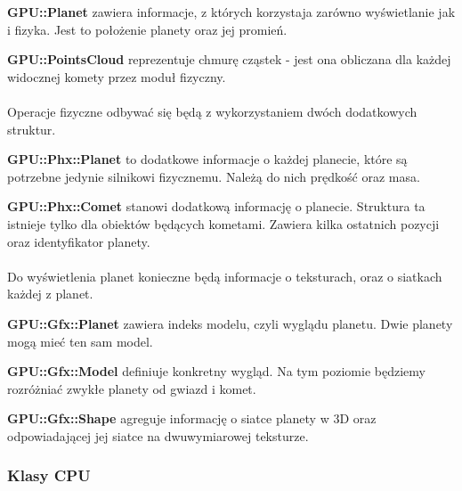 \begin{description}
\item{\bf GPU::Planet} zawiera informacje, z których korzystaja zarówno wyświetlanie jak i fizyka. Jest to położenie planety oraz jej promień.
\item{\bf GPU::PointsCloud} reprezentuje chmurę cząstek - jest ona obliczana dla każdej widocznej komety przez moduł fizyczny.
\end{description}

\paragraph{}

Operacje fizyczne odbywać się będą z wykorzystaniem dwóch dodatkowych struktur.

\begin{description}
\item{\bf GPU::Phx::Planet} to dodatkowe informacje o każdej planecie, które są potrzebne jedynie silnikowi fizycznemu. Należą do nich prędkość oraz masa.
\item{\bf GPU::Phx::Comet} stanowi dodatkową informację o planecie. Struktura ta istnieje tylko dla obiektów będących kometami. Zawiera kilka ostatnich pozycji oraz identyfikator planety.
\end{description}

\paragraph{}

Do wyświetlenia planet konieczne będą informacje o teksturach, oraz o siatkach każdej z planet.

\begin{description}
\item{\bf GPU::Gfx::Planet} zawiera indeks modelu, czyli wyglądu planetu. Dwie planety mogą mieć ten sam model.
\item{\bf GPU::Gfx::Model} definiuje konkretny wygląd. Na tym poziomie będziemy rozróżniać zwykłe planety od gwiazd i komet.
\item{\bf GPU::Gfx::Shape} agreguje informację o siatce planety w 3D oraz odpowiadającej jej siatce na dwuwymiarowej teksturze.
\end{description}

\subsubsection{Klasy CPU}

